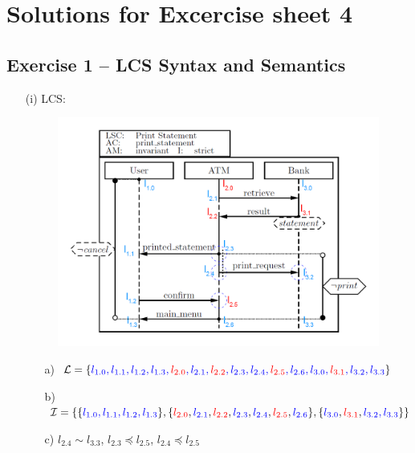 \documentclass{scrartcl}
\begin{document}
\section*{Solutions for Excercise sheet 4}

\subsection*{Exercise 1 – LCS Syntax and Semantics}

	\begin{itemize}
		\item[(i)] LCS:
		\begin{figure}[h]
			\centering
			\includegraphics[width=\textwidth]{lcs.png}
		\end{figure}
		\begin{itemize}
			\item[a)] $\mathcal{L} = \{ 
				{\color{blue} l_{1.0}, l_{1.1}, l_{1.2}, l_{1.3},
			 	{\color{red} l_{2.0}}, l_{2.1}, {\color{red} l_{2.2}}, l_{2.3}, l_{2.4}, {\color{red} l_{2.5} }, l_{2.6},
			  	l_{3.0}, {\color{red} l_{3.1}}, l_{3.2}, l_{3.3}} \}$
		  	\item[b)] $ \mathcal{I} = \{ 
		  					\{ {\color{blue} l_{1.0}, l_{1.1}, l_{1.2}, l_{1.3}} \},
		  					\{ {\color{red} l_{2.0}}, {\color{blue} l_{2.1}}, {\color{red} l_{2.2}}, {\color{blue} l_{2.3}}, {\color{blue} l_{2.4}}, {\color{red} l_{2.5} }, {\color{blue} l_{2.6} } \},
		  					\{ {\color{blue} l_{3.0} }, {\color{red} l_{3.1}},  {\color{blue} l_{3.2}, l_{3.3} } \}
  						 \} $
		 	\item[c)] $ l_{2.4} \sim l_{3.3} $, $ l_{2.3} \preceq l_{2.5} $, $ l_{2.4} \preceq l_{2.5} $

\end{itemize}
\end{itemize}
\end{document}
